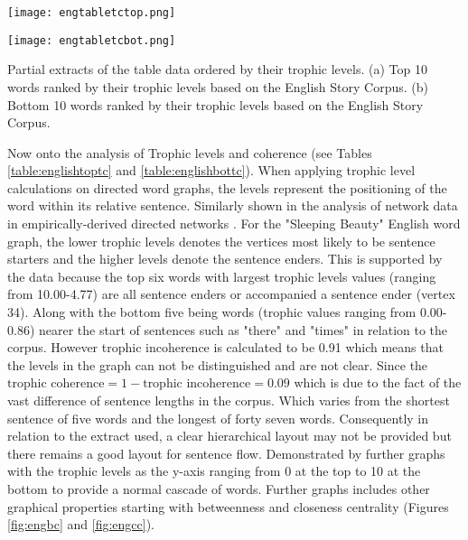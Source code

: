 \begin{table}[H]
\centering
\begin{subtable}{.45\textwidth}
	\centering
	\texttt{[image: engtabletctop.png]}
	\caption{}
	\label{table:englishtoptc}
\end{subtable}
\hfill
\begin{subtable}{.45\textwidth}
	\centering
	\texttt{[image: engtabletcbot.png]}
	\caption{}
	\label{table:englishbottc}
\end{subtable}
\caption{Partial extracts of the table data ordered by their trophic levels. (a) Top 10 words ranked by their trophic levels based on the English Story Corpus. (b) Bottom 10 words ranked by their trophic levels based on the English Story Corpus.}
\end{table}

Now onto the analysis of Trophic levels and coherence (see Tables \ref{table:englishtoptc} and \ref{table:englishbottc}). When applying trophic level calculations on directed word graphs, the levels represent the positioning of the word within its relative sentence. Similarly shown in the analysis of network data in empirically-derived directed networks \cite{johnson2017looplessness}. For the "Sleeping Beauty" English word graph, the lower trophic levels denotes the vertices most likely to be sentence starters and the higher levels denote the sentence enders. This is supported by the data because the top six words with largest trophic levels values (ranging from 10.00-4.77) are all sentence enders or accompanied a sentence ender (vertex 34). Along with the bottom five being words (trophic values ranging from 0.00-0.86) nearer the start of sentences such as "there" and "times" in relation to the corpus. However trophic incoherence is calculated to be 0.91 which means that the levels in the graph can not be distinguished and are not clear. Since the $\text{trophic coherence} = 1 - \text{trophic incoherence} = 0.09$ which is due to the fact of the vast difference of sentence lengths in the corpus. Which varies from the shortest sentence of five words and the longest of forty seven words. Consequently in relation to the extract used, a clear hierarchical layout may not be provided but there remains a good layout for sentence flow. Demonstrated by further graphs with the trophic levels as the y-axis ranging from 0 at the top to 10 at the bottom to provide a normal cascade of words. Further graphs includes other graphical properties starting with betweenness and closeness centrality (Figures \ref{fig:engbc} and \ref{fig:engcc}).


